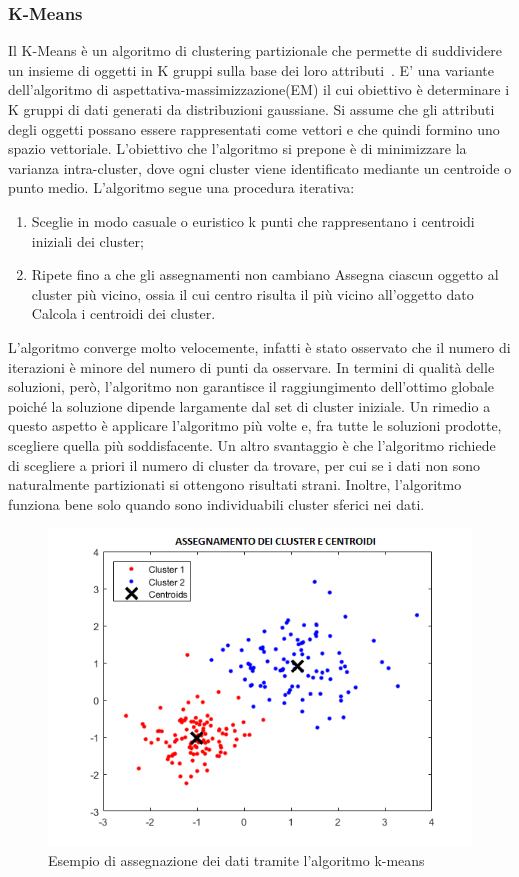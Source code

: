 \subsubsection{K-Means}
Il K-Means è un algoritmo di clustering partizionale che permette di suddividere un insieme di oggetti in K gruppi sulla base dei loro attributi~\cite{10}. E' una variante dell'algoritmo di aspettativa-massimizzazione(EM) il cui obiettivo è determinare i K gruppi di dati generati da distribuzioni gaussiane. Si assume che gli attributi degli oggetti possano essere rappresentati come vettori e che quindi formino uno spazio vettoriale. L'obiettivo che l'algoritmo si prepone è di minimizzare la varianza intra-cluster, dove ogni cluster viene identificato mediante un centroide o punto medio. L'algoritmo segue una procedura iterativa:
\begin{enumerate}
	\item Sceglie in modo casuale o euristico k punti che rappresentano i centroidi iniziali dei cluster;
	\item Ripete fino a che gli assegnamenti non cambiano
	\subitem Assegna ciascun oggetto al cluster più vicino, ossia il cui centro risulta il più vicino all'oggetto dato
	\subitem Calcola i centroidi dei cluster.
\end{enumerate}
L'algoritmo converge molto velocemente, infatti è stato osservato che il numero di iterazioni è minore del numero di punti da osservare. In termini di qualità delle soluzioni, però, l'algoritmo non garantisce il raggiungimento dell'ottimo globale poiché la soluzione dipende largamente dal set di cluster iniziale. Un rimedio a questo aspetto è applicare l'algoritmo più volte e, fra tutte le soluzioni prodotte, scegliere quella più soddisfacente. Un altro svantaggio è che l'algoritmo richiede di scegliere a priori il numero di cluster da trovare, per cui se i dati non sono naturalmente partizionati si ottengono risultati strani. Inoltre, l'algoritmo funziona bene solo quando sono individuabili cluster sferici nei dati.
\begin{figure}[h!]
	\centering
	\includegraphics[width=1\textwidth]{images/example_kmeans.png}
	\caption{Esempio di assegnazione dei dati tramite l'algoritmo k-means}
\end{figure}
